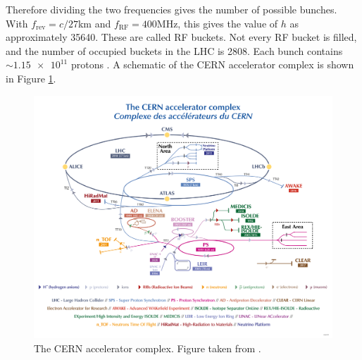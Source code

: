 Therefore dividing the two frequencies gives the number of possible bunches. With $f_{\text{rev}}=c/27$km and $f_{\text{RF}}=400$MHz, this gives the value of $h$ as approximately 35640. These are called RF buckets. Not every RF bucket is filled, and the number of occupied buckets in the LHC is 2808. Each bunch contains $\sim \num{1.15e11}$ protons \cite{LHC:design,LHC:acceleratorspedestrians,LHC:rfcavities}. A schematic of the CERN accelerator complex is shown in Figure \ref{fig:LHC:ccc}.
\begin{figure}[t]
    \centering
    \includegraphics[width=\textwidth]{plots/lhc/CCC-v2022.png}
    \caption{The CERN accelerator complex. Figure taken from \cite{LHC:CCC}.\label{fig:LHC:ccc}}
\end{figure}


